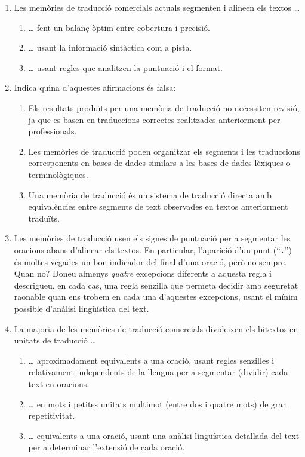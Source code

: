 \begin{enumerate}
\item Les memòries de traducció comercials actuals segmenten i alineen
  els textos {\ldots}
  \begin{enumerate}
  \item {\ldots} fent un balanç òptim entre cobertura i precisió.
  \item {\ldots} usant la informació sintàctica com a pista.
  \item {\ldots} usant regles que analitzen la puntuació i el format.
  \end{enumerate}

\item Indica quina d'aquestes afirmacions és falsa:
  \begin{enumerate}
  \item Els resultats produïts per una memòria de traducció no
    necessiten revisió, ja que es basen en traduccions correctes
    realitzades anteriorment per professionals.
  \item Les memòries de traducció poden organitzar els segments i les
    traduccions corresponents en bases de dades similars a les bases
    de dades lèxiques o terminològiques.
  \item Una memòria de traducció és un sistema de traducció directa
    amb equivalències entre segments de text observades en textos
    anteriorment traduïts.
  \end{enumerate}

\item Les memòries de traducció usen els signes de puntuació per a
  segmentar les oracions abans d'alinear els textos. En particular,
  l'aparició d'un punt (``\texttt{.}'') és moltes vegades un bon
  indicador del final d'una oració, però no sempre. Quan no? Doneu
  almenys \emph{quatre} excepcions diferents a aquesta regla i
  descrigueu, en cada cas, una regla senzilla que permeta decidir amb
  seguretat raonable quan ens trobem en cada una d'aquestes
  excepcions, usant el mínim possible d'anàlisi lingüística del text.

\item La majoria de les memòries de traducció comercials divideixen
  els bitextos en unitats de traducció {\ldots}
  \begin{enumerate}
  \item {\ldots} aproximadament equivalents a una oració, usant regles
    senzilles i relativament independents de la llengua per a
    segmentar (dividir) cada text en oracions.
  \item {\ldots} en mots i petites unitats multimot (entre dos i
    quatre mots) de gran repetitivitat.
  \item {\ldots} equivalents a una oració, usant una anàlisi
    lingüística detallada del text per a determinar l'extensió de cada
    oració.
  \end{enumerate}


\end{enumerate}
